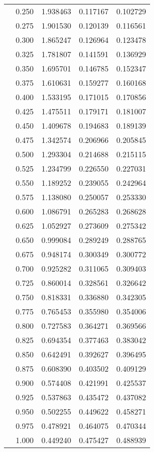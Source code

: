 \begin{tabular}{llrrr}
         & 0.250 &   1.938463 &   0.117167 &   0.102729 \\
         & 0.275 &   1.901530 &   0.120139 &   0.116561 \\
         & 0.300 &   1.865247 &   0.126964 &   0.123478 \\
         & 0.325 &   1.781807 &   0.141591 &   0.136929 \\
         & 0.350 &   1.695701 &   0.146785 &   0.152347 \\
         & 0.375 &   1.610631 &   0.159277 &   0.160168 \\
         & 0.400 &   1.533195 &   0.171015 &   0.170856 \\
         & 0.425 &   1.475511 &   0.179171 &   0.181007 \\
         & 0.450 &   1.409678 &   0.194683 &   0.189139 \\
         & 0.475 &   1.342574 &   0.206966 &   0.205845 \\
         & 0.500 &   1.293304 &   0.214688 &   0.215115 \\
         & 0.525 &   1.234799 &   0.226550 &   0.227031 \\
         & 0.550 &   1.189252 &   0.239055 &   0.242964 \\
         & 0.575 &   1.138080 &   0.250057 &   0.253330 \\
         & 0.600 &   1.086791 &   0.265283 &   0.268628 \\
         & 0.625 &   1.052927 &   0.273609 &   0.275342 \\
         & 0.650 &   0.999084 &   0.289249 &   0.288765 \\
         & 0.675 &   0.948174 &   0.300349 &   0.300772 \\
         & 0.700 &   0.925282 &   0.311065 &   0.309403 \\
         & 0.725 &   0.860014 &   0.328561 &   0.326642 \\
         & 0.750 &   0.818331 &   0.336880 &   0.342305 \\
         & 0.775 &   0.765453 &   0.355980 &   0.354006 \\
         & 0.800 &   0.727583 &   0.364271 &   0.369566 \\
         & 0.825 &   0.694354 &   0.377463 &   0.383042 \\
         & 0.850 &   0.642491 &   0.392627 &   0.396495 \\
         & 0.875 &   0.608390 &   0.403502 &   0.409129 \\
         & 0.900 &   0.574408 &   0.421991 &   0.425537 \\
         & 0.925 &   0.537863 &   0.435472 &   0.437082 \\
         & 0.950 &   0.502255 &   0.449622 &   0.458271 \\
         & 0.975 &   0.478921 &   0.464075 &   0.470344 \\
         & 1.000 &   0.449240 &   0.475427 &   0.488939 \\
\bottomrule
\end{tabular}
